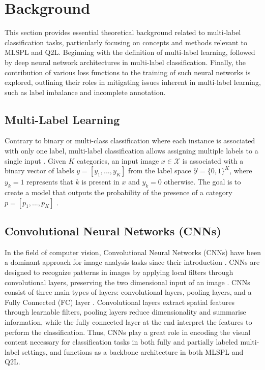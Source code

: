\documentclass[lettersize,journal]{IEEEtran}
\begin{document}
\section{Background}
This section provides essential theoretical background related to multi-label classification tasks, particularly focusing on concepts and methods relevant to MLSPL and Q2L.  Beginning with the definition of multi-label learning, followed by deep neural network architectures in multi-label classification. Finally, the contribution of various loss functions to the training of such neural networks is explored, outlining their roles in mitigating issues inherent in multi-label learning, such as label imbalance and incomplete annotation.

\subsection{Multi-Label Learning}
Contrary to binary or multi-class classification where each instance is associated with only one label, multi-label classification allows assigning multiple labels to a single input \cite{mlsp}. Given $K$ categories, an input image $x\in \mathcal{X}$ is associated with a binary vector of labels $y=[y_1,...,y_K]$ from the label space $\mathcal{Y}=\{0,1\}^K$, where $y_k=1$ represents that $k$ is present in $x$ and $y_k=0$ otherwise. The goal is to create a model that outputs the probability of the presence of a category $p=[p_1,...,p_K]$ \cite{mlsp,Query2Label}.

\subsection{Convolutional Neural Networks (CNNs)}
In the field of computer vision, Convolutional Neural Networks (CNNs) have been a dominant approach for image analysis tasks since their introduction \cite{lecun95}. CNNs are designed to recognize patterns in images by applying local filters through convolutional layers, preserving the two dimensional input of an image \cite{zhang2023dive}. CNNs consist of three main types of layers: convolutional layers, pooling layers, and a Fully Connected (FC) layer \cite{asawaCS231n}. Convolutional layers extract spatial features through learnable filters, pooling layers reduce dimensionality and summarise information, while the fully connected layer at the end interpret the features to perform the classification. Thus, CNNs play a great role in encoding the visual content necessary for classification tasks in both fully and partially labeled multi-label settings, and functions as a backbone architecture in both MLSPL and Q2L.
\end{document}
